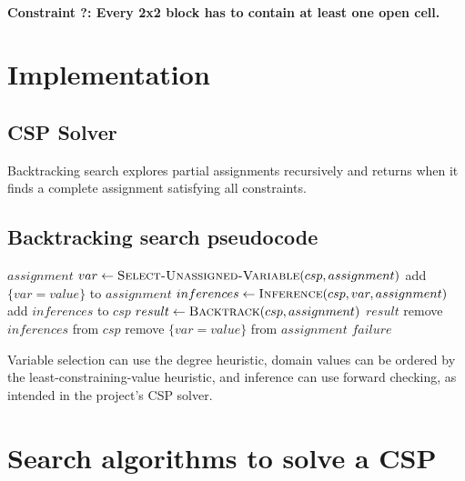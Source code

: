 \documentclass[11pt,a4paper]{article}
\begin{document}
\paragraph{Constraint ?: Every 2x2 block has to contain at least one open cell. }


\section{Implementation }

\subsection{CSP Solver }

Backtracking search explores partial assignments recursively and returns
when it finds a complete assignment satisfying all constraints.

\subsection{Backtracking search pseudocode}

\begin{algorithm}[htbp]
\caption{Backtracking search for a CSP}
\label{alg:backtracking-search}
\begin{algorithmic}[1]
    \State \Return {}
\EndFunction
\Statex
{}
        \State \Return $assignment$
    \EndIf
    \State $var \gets \Call{Select-Unassigned-Variable}{csp, assignment}$
            \State add $\{var = value\}$ to $assignment$
            \State $inferences \gets \Call{Inference}{csp, var, assignment}$
                \State add $inferences$ to $csp$
                \State $result \gets \Call{Backtrack}{csp, assignment}$
                    \State \Return $result$
                \EndIf
                \State remove $inferences$ from $csp$
            \EndIf
            \State remove $\{var = value\}$ from $assignment$
        \EndIf
    \EndFor
    \State \Return $\mathit{failure}$
\EndFunction
\end{algorithmic}
\end{algorithm}

Variable selection can use the degree heuristic, domain values can be
ordered by the least-constraining-value heuristic, and inference can use
forward checking, as intended in the project's CSP solver.



\section{Search algorithms to solve a CSP}
\end{document}
